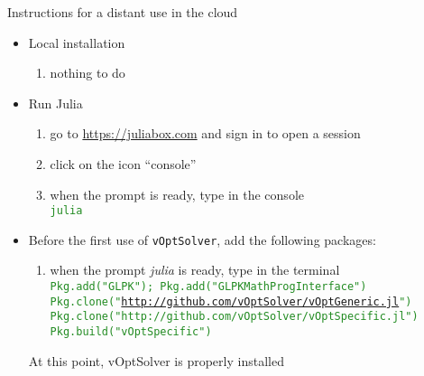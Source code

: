 \documentclass[10pt,xcolor=dvipsnames]{beamer}
\newcommand{\green}{\textcolor{ForestGreen}}
\begin{document}
%
% 
\begin{frame}{Instructions for a distant use in the cloud}

\begin{itemize}
\item Local installation
\begin{enumerate}
  \item nothing to do
\end{enumerate}
\medskip
  
\item Run Julia
\begin{enumerate}
  \item go to \url{https://juliabox.com} and sign in to open a session
  \item click on the icon ``console''
  \item when the prompt is ready, type in the console \\
      \green{\texttt{julia}}
\end{enumerate}
\medskip

\item Before the first use of \texttt{vOptSolver}, add the following packages:
\begin{enumerate}
  \item when the prompt \textit{julia} is ready, type in the terminal \\ 
     \green{\texttt{Pkg.add("{GLPK}"); Pkg.add("GLPKMathProgInterface")}}  
     \green{\texttt{Pkg.clone("\url{http://github.com/vOptSolver/vOptGeneric.jl}")}}\\
     \green{\texttt{Pkg.clone("{http://github.com/vOptSolver/vOptSpecific.jl}")}}
     \green{\texttt{Pkg.build("{vOptSpecific}")}}     
\end{enumerate}  
At this point, vOptSolver is properly installed
\medskip

\end{itemize}

\end{frame}
\end{document}
